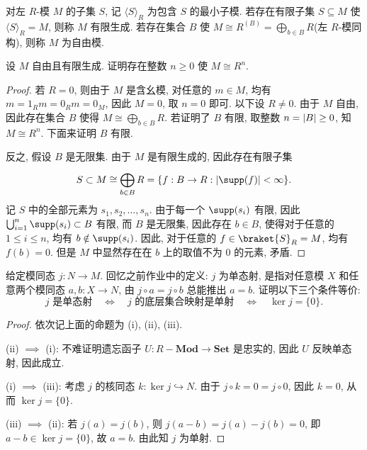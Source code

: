 \documentclass{article}
\begin{document}
\begin{problem}
对左 $R$-模 $M$ 的子集 $S$, 记 $\langle S\rangle_R$ 为包含 $S$ 的最小子模. 若存在有限子集 $S\subseteq M$ 使 $\langle S\rangle_R=M$, 则称 $M$ 有限生成. 若存在集合 $B$ 使 $M\cong R^{(B)}=\bigoplus_{b\in B}R$(左 $R$-模同构), 则称 $M$ 为自由模.

设 $M$ 自由且有限生成. 证明存在整数 $n\geq 0$ 使 $M\cong R^n$.
\end{problem}

\begin{proof}
	若 $R = 0$, 则由于 $M$ 是含幺模, 对任意的 $m \in M$, 均有 $m = 1_Rm = 0_Rm = 0_M$, 因此 $M = 0$, 取 $n = 0$ 即可. 以下设 $R \neq 0$. 由于 $M$ 自由, 因此存在集合 $B$ 使得 $M \cong \bigoplus_{b \in B}^{}R$. 若证明了 $B$ 有限, 取整数 $n = \left|B\right| \ge 0$, 知 $M \cong R^n$. 下面来证明 $B$ 有限.

	反之, 假设 $B$ 是无限集. 由于 $M$ 是有限生成的, 因此存在有限子集 
	\[ S \subset M \cong \bigoplus_{b \in B}^{}R = \{f: B \to R: \abs{\supp(f)} < \infty\}. \]
	记 $S$ 中的全部元素为 $s_1, s_2, \dots, s_n$. 由于每一个 $\supp(s_i)$ 有限, 因此 $\bigcup_{i=1}^{n}\supp(s_i) \subset B$ 有限, 而 $B$ 是无限集, 因此存在 $b \in B$, 使得对于任意的 $1 \le i \le n$, 均有 $b \notin \supp(s_i)$. 因此, 对于任意的 $f \in \braket{S}_R = M$, 均有 $f(b) = 0$. 但是 $M$ 中显然存在在 $b$ 上的取值不为 $0$ 的元素, 矛盾.
\end{proof}



\begin{problem}
给定模同态 $j:N\to M$. 回忆之前作业中的定义: $j$ 为单态射, 是指对任意模 $X$ 和任意两个模同态 $a,b:X\to N$, 由 $j\circ a=j\circ b$ 总能推出 $a=b$. 证明以下三个条件等价:
\[
  j\text{ 是单态射}\quad\Longleftrightarrow\quad
  j\text{ 的底层集合映射是单射}\quad\Longleftrightarrow\quad
  \ker j=\{0\}.
\]
\end{problem}

\begin{proof}
	依次记上面的命题为 (i), (ii), (iii). 

	(ii) $\implies$ (i): 不难证明遗忘函子 $U: R-\mathbf{Mod} \to \mathbf{Set}$ 是忠实的, 因此 $U$ 反映单态射, 因此成立.

	(i) $\implies$ (iii): 考虑 $j$ 的核同态 $k: \ker j \hookrightarrow N$. 由于 $j \circ k = 0 = j \circ 0$, 因此 $k = 0$, 从而 $\ker j = \{0\}$. 

	(iii) $\implies$ (ii): 若 $j(a) = j(b)$, 则 $j(a-b) = j(a) - j(b) = 0$, 即 $a - b \in \ker j = \{0\}$, 故 $a = b$. 由此知 $j$ 为单射.
\end{proof}
\end{document}
